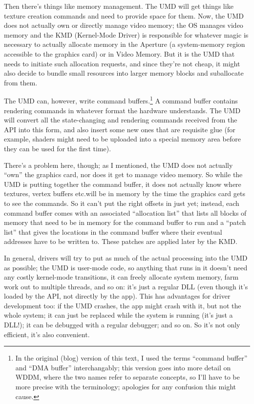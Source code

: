 Then there's things like memory management. The UMD will get things like
texture creation commands and need to provide space for them. Now, the UMD does 
not actually own or directly manage video memory; the OS manages video memory 
and the KMD (Kernel-Mode Driver) is responsible for whatever magic is necessary 
to actually allocate memory in the Aperture (a system-memory region accessible 
to the graphics card) or in Video Memory. But it is the UMD that needs to 
initiate such allocation requests, and since they're not cheap, it might also 
decide to bundle small resources into larger memory blocks and suballocate from 
them.

The UMD can, however, write command buffers.\footnote{In the original (blog)
version of this text, I used the terms ``command buffer'' and ``DMA buffer''
interchangably; this version goes into more detail on WDDM, where the two names 
refer to separate concepts, so I'll have to be more precise with the 
terminology; apologies for any confusion this might cause.} A command buffer 
contains rendering commands in whatever format the hardware understands. The 
UMD will convert all the state-changing and rendering commands received from 
the API into this form, and also insert some new ones that are requisite glue 
(for example, shaders might need to be uploaded into a special memory area 
before they can be used for the first time).

There's a problem here, though; as I mentioned, the UMD does not actually 
``own'' the graphics card, nor does it get to manage video memory. So while the 
UMD is putting together the command buffer, it does not actually know where 
textures, vertex buffers etc.\@ will be in memory by the time the graphics card 
gets to see the commands. So it can't put the right offsets in just yet;
instead, each command buffer comes with an associated ``allocation list'' that 
lists all blocks of memory that need to be in memory for the command buffer to 
run and a ``patch list'' that gives the locations in the command buffer where 
their eventual addresses have to be written to. These patches are applied later 
by the KMD.

In general, drivers will try to put as much of the actual processing into the
UMD as possible; the UMD is user-mode code, so anything that runs in it doesn't
need any costly kernel-mode transitions, it can freely allocate system memory, 
farm work out to multiple threads, and so on: it's just a regular DLL (even 
though it's loaded by the API, not directly by the app). This has advantages 
for
driver development too: if the UMD crashes, the app might crash with it, but 
not the whole system; it can just be replaced while the system is running (it's
just a DLL!); it can be debugged with a regular debugger; and so on. So it's
not only efficient, it's also convenient.

